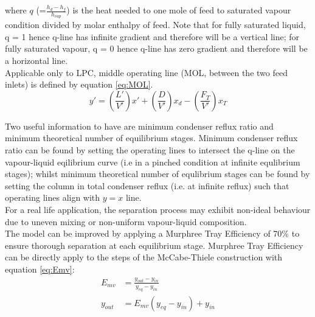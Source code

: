         where $q$ (=$\frac{h_d-h_f}{h_{vap}}$) is the heat needed to one mole of feed to saturated vapour condition divided by molar enthalpy of feed. Note that for fully saturated liquid, q = 1 hence q-line has infinite gradient and therefore will be a vertical line; for fully saturated vapour, q = 0 hence q-line has zero gradient and therefore will be a horizontal line.\\
        Applicable only to LPC, middle operating line (MOL, between the two feed inlets) is defined by equation \ref{eq:MOL}. \\
        \begin{equation}
            y' = \left(\frac{L'}{V'}\right)x' + \left(\frac{D}{V'}\right)x_d -  \left(\frac{F_T}{V'}\right)x_T
            \label{eq:MOL}
        \end{equation}
        
        \noindent Two useful information to have are minimum condenser reflux ratio and minimum theoretical number of equilibrium stages. Minimum condenser reflux ratio can be found by setting the operating lines to intersect the q-line on the vapour-liquid eqilibrium curve (i.e in a pinched condition at infinite equlibrium stages); whilst minimum theoretical number of equlibrium stages can be found by setting the column in total condenser reflux (i.e. at infinite reflux) such that operating lines align with $y=x$ line.\\
        For a real life application, the separation process may exhibit non-ideal behaviour due to uneven mixing or non-uniform vapour-liquid composition. \\
        The model can be improved by applying a Murphree Tray Efficiency of 70\% to ensure thorough separation at each equilibrium stage. Murphree Tray Efficiency can be directly apply to the steps of the McCabe-Thiele construction with equation \ref{eq:Emv}: \\
        \begin{equation}
            \begin{aligned}
                E_{mv} & = \frac{y_{out} - y_{in}}{y_{eq} - y_{in}} \\
                y_{out} & = E_{mv}\left(y_{eq}-y_{in}\right) + y_{in}
            \end{aligned}
            \label{eq:Emv}
        \end{equation}
        
